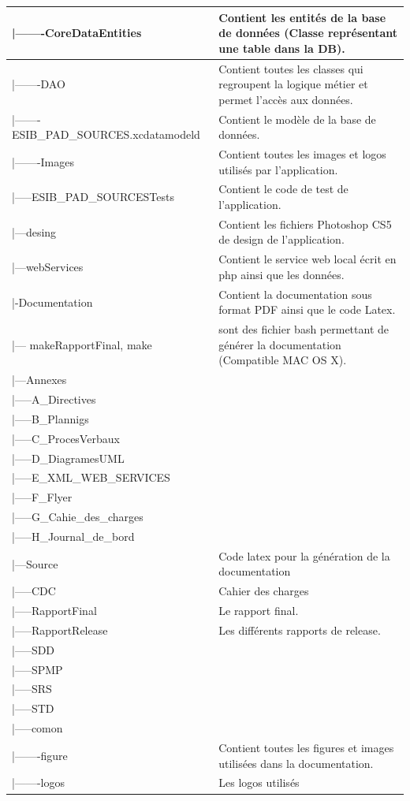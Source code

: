 \documentclass[12pt,a4paper,twoside]{report}
\begin{document}
\begin{longtable}{|l|p{8cm}|}
 \hline |-------CoreDataEntities & Contient les entités de la base de données (Classe représentant une table dans la DB).\\
 \hline |-------DAO & Contient toutes les classes qui regroupent la logique métier et permet l'accès aux données.\\
 \hline |-------ESIB\_PAD\_SOURCES.xcdatamodeld &Contient le modèle de la base de données.\\
 \hline |-------Images & Contient toutes les images et logos utilisés par l'application.\\
 \hline |-----ESIB\_PAD\_SOURCESTests & Contient le code de test de l'application.\\
 \hline |---desing & Contient les fichiers Photoshop CS5 de design de l'application.\\
 \hline |---webServices & Contient le service web local écrit en php ainsi que les données.\\
 \hline |-Documentation & Contient la documentation sous format PDF ainsi que le code Latex.\\
 \hline |--- makeRapportFinal, make & sont des fichier bash permettant de générer la documentation (Compatible MAC OS X).\\
 \hline |---Annexes & \\
 \hline |-----A\_Directives &\\
 \hline |-----B\_Plannigs & \\
 \hline |-----C\_ProcesVerbaux &\\
 \hline |-----D\_DiagramesUML &\\
 \hline |-----E\_XML\_WEB\_SERVICES &\\
 \hline |-----F\_Flyer &\\
 \hline |-----G\_Cahie\_des\_charges &\\
 \hline |-----H\_Journal\_de\_bord &\\
 \hline |---Source & Code latex pour la génération de la documentation\\
 \hline |-----CDC & Cahier des charges\\
 \hline |-----RapportFinal & Le rapport final.\\
 \hline |-----RapportRelease & Les différents rapports de release.\\
 \hline |-----SDD &\\
 \hline |-----SPMP &\\
 \hline |-----SRS &\\
 \hline |-----STD &\\
 \hline |-----comon &\\
 \hline |-------figure & Contient toutes les figures et images utilisées dans la documentation.\\
 \hline |-------logos & Les logos utilisés\\
\hline 
\end{longtable} 
\end{document}
